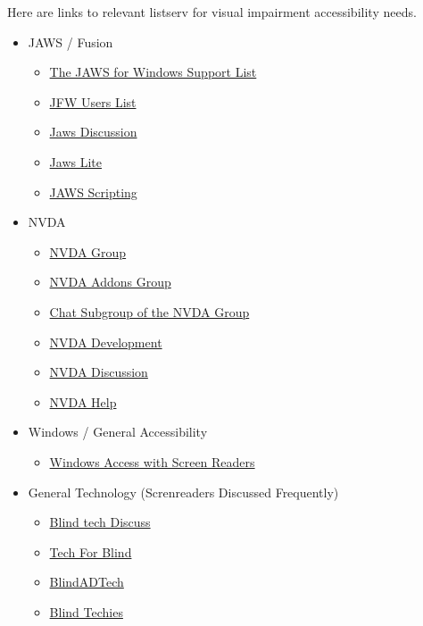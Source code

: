 \documentclass[12pt,letterpaper,twoside]{extreport}
\begin{document}
\begin{appendices}
Here are links to relevant listserv for visual impairment accessibility needs.
\begin{itemize}[leftmargin=*]
\item JAWS / Fusion
\begin{itemize}[leftmargin=2em]
\item \href{http://www.groups.io/g/jfw/}{The JAWS for Windows Support List} 
\item \href{https://groups.io/g/jfw-users/}{JFW Users List}
\item \href{https://groups.io/g/jawsdiscussion/}{Jaws Discussion}
\item \href{https://groups.io/g/jawslite/}{Jaws Lite}
\item \href{https://groups.io/g/jawsscripting/}{JAWS Scripting}
\end{itemize}
\item NVDA
\begin{itemize}[leftmargin=2em]
\item \href{https://nvda.groups.io/g/nvda/ }{NVDA Group}
\item \href{https://nvda-addons.groups.io/g/nvda-addons}{NVDA Addons Group}
\item \href{ https://nvda.groups.io/g/chat/ }{Chat Subgroup of the NVDA Group}
\item \href{https://groups.io/g/nvda-devel/messages}{NVDA Development}
\item \href{https://groups.io/g/nvdadiscussion/messages}{NVDA Discussion}
\item \href{https://groups.io/g/NVDAhelp/messages}{NVDA Help}
\end{itemize}
\item Windows / General Accessibility
\begin{itemize}[leftmargin=2em]
\item \href{https://winaccess.groups.io/g/winaccess}{Windows Access with Screen Readers}
\end{itemize}
\item General Technology (Screnreaders Discussed Frequently)
\begin{itemize}[leftmargin=2em]
\item \href{https://groups.io/g/blindtechdiscuss/messages}{Blind tech Discuss}
\item \href{https://groups.io/g/tech-for-blind}{Tech For Blind}
\item \href{https://groups.io/g/blindadtech}{BlindADTech}
\item \href{https://groups.io/g/blind-techies/messages}{Blind Techies}
\end{itemize}
\end{itemize}


\end{appendices}
\end{document}
